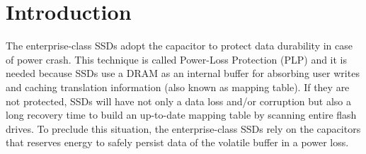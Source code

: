 \section{Introduction}


The enterprise-class SSDs adopt the capacitor to protect data durability in case of power crash. 
This technique is called Power-Loss Protection (PLP) and it is needed because SSDs use a DRAM as an internal buffer for absorbing user writes and caching translation information (also known as mapping table). 
If they are not protected, SSDs will have not only a data loss and/or corruption but also a long recovery time to build an up-to-date  mapping table by scanning entire flash drives.
To preclude this situation, the enterprise-class SSDs rely on the capacitors that reserves energy to safely persist data of the volatile buffer in a power loss.


